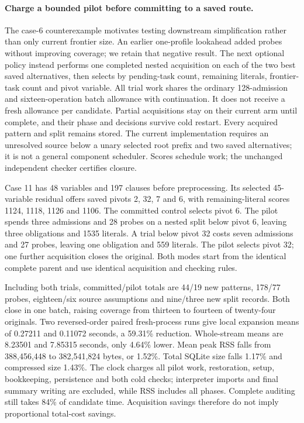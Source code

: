 \documentclass[11pt,a4paper]{article}
\numberwithin{equation}{section}
\theoremstyle{plain}
\theoremstyle{definition}
\theoremstyle{remark}
\begin{document}
\paragraph{Charge a bounded pilot before committing to a saved route.}
The case-6 counterexample motivates testing downstream simplification rather
than only current frontier size. An earlier one-profile lookahead added probes
without improving coverage; we retain that negative result. The next optional
policy instead performs one completed nested acquisition on each of the two
best saved alternatives, then selects by pending-task count, remaining literals,
frontier-task count and pivot variable. All trial work shares the ordinary
128-admission and sixteen-operation batch allowance with continuation. It does
not receive a fresh allowance per candidate. Partial acquisitions stay on their
current arm until complete, and their phase and decisions survive cold restart.
Every acquired pattern and split remains stored. The current implementation
requires an unresolved source below a unary selected root prefix and two saved
alternatives; it is not a general component scheduler. Scores schedule work;
the unchanged independent checker certifies closure.

Case 11 has 48 variables and 197 clauses before preprocessing. Its selected
45-variable residual offers saved pivots 2, 32, 7 and 6, with remaining-literal
scores 1124, 1118, 1126 and 1106. The committed control selects pivot 6. The pilot
spends three admissions and 28 probes on a nested split below pivot 6, leaving
three obligations and 1535 literals. A trial below pivot 32 costs seven admissions
and 27 probes, leaving one obligation and 559 literals. The pilot selects pivot
32; one further acquisition closes the original. Both modes start from the
identical complete parent and use identical acquisition and checking rules.

Including both trials, committed/pilot totals are 44/19 new patterns, 178/77
probes, eighteen/six source assumptions and nine/three new split records. Both
close in one batch, raising coverage from thirteen to fourteen of twenty-four
originals. Two reversed-order paired fresh-process runs give local expansion
means of 0.27211 and 0.11072 seconds, a 59.31\% reduction. Whole-stream means
are 8.23501 and 7.85315 seconds, only 4.64\% lower. Mean peak RSS falls from
388,456,448 to 382,541,824 bytes, or 1.52\%. Total SQLite size falls 1.17\% and
compressed size 1.43\%. The clock charges all pilot work, restoration, setup,
bookkeeping, persistence and both cold checks; interpreter imports and final
summary writing are excluded, while RSS includes all phases. Complete auditing
still takes 84\% of candidate time. Acquisition savings therefore do not imply
proportional total-cost savings.
\end{document}
